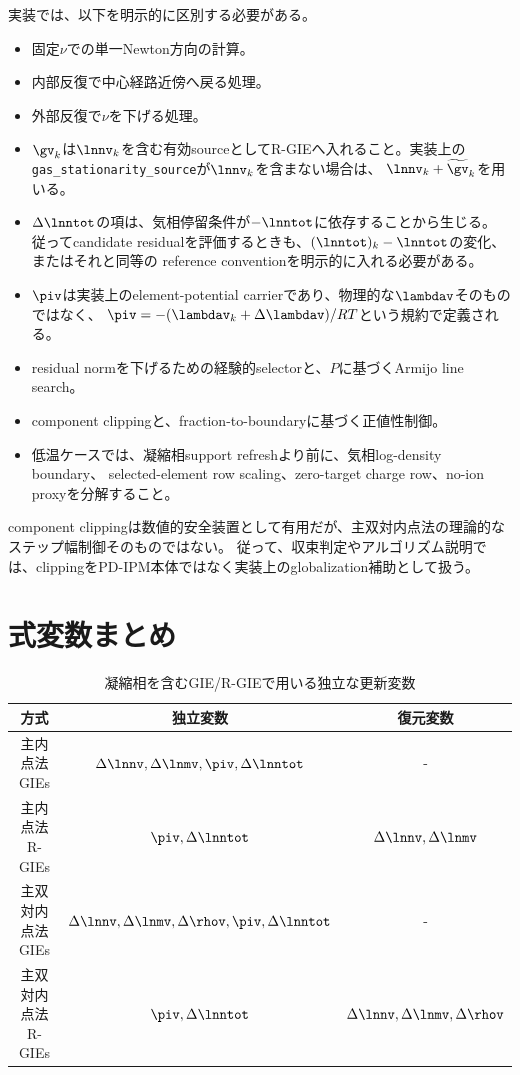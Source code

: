 実装では、以下を明示的に区別する必要がある。
\begin{itemize}
    \item 固定$\nu$での単一Newton方向の計算。
    \item 内部反復で中心経路近傍へ戻る処理。
    \item 外部反復で$\nu$を下げる処理。
    \item $\gv_k$は$\lnnv_k$を含む有効sourceとしてR-GIEへ入れること。実装上の
    \texttt{gas\_stationarity\_source}が$\lnnv_k$を含まない場合は、
    $\lnnv_k+\widetilde{\gv}_k$を用いる。
    \item $\Delta\lnntot$の項は、気相停留条件が$-\lnntot$に依存することから生じる。
    従ってcandidate residualを評価するときも、$(\lnntot)_k-\lnntot$の変化、またはそれと同等の
    reference conventionを明示的に入れる必要がある。
    \item $\piv$は実装上のelement-potential carrierであり、物理的な$\lambdav$そのものではなく、
    $\piv = -(\lambdav_k+\Delta\lambdav)/RT$という規約で定義される。
    \item residual normを下げるための経験的selectorと、$P$に基づくArmijo line search。
    \item component clippingと、fraction-to-boundaryに基づく正値性制御。
    \item 低温ケースでは、凝縮相support refreshより前に、気相log-density boundary、
    selected-element row scaling、zero-target charge row、no-ion proxyを分解すること。
\end{itemize}
component clippingは数値的安全装置として有用だが、主双対内点法の理論的なステップ幅制御そのものではない。
従って、収束判定やアルゴリズム説明では、clippingをPD-IPM本体ではなく実装上のglobalization補助として扱う。

\section{式変数まとめ}

\begin{table}[]
    \centering
    \begin{tabular}{c|cc}
        方式 & 独立変数 & 復元変数 \\
        \hline
        主内点法 GIEs &  $\Delta \lnnv, \Delta \lnmv, \piv, \Delta \lnntot$ & - \\
        主内点法 R-GIEs &  $\piv, \Delta \lnntot$ & $\Delta\lnnv,\Delta\lnmv$\\
        主双対内点法 GIEs &  $\Delta \lnnv, \Delta \lnmv, \Delta \rhov, \piv, \Delta \lnntot$ & - \\
        主双対内点法 R-GIEs & $\piv, \Delta \lnntot$ & $\Delta\lnnv,\Delta\lnmv,\Delta\rhov$ \\
    \end{tabular}
    \caption{凝縮相を含むGIE/R-GIEで用いる独立な更新変数}
    \label{tab:placeholder}
\end{table}
